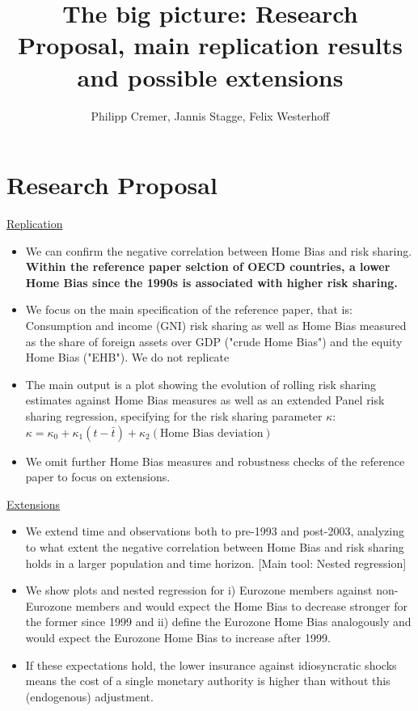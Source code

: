 \documentclass{article}
\title{The big picture: Research Proposal, main replication results and possible extensions}
\author{Philipp Cremer, Jannis Stagge, Felix Westerhoff}
\begin{document}
\maketitle

\section{Research Proposal}
\noindent \underline{Replication}
\begin{itemize}
    \item We can confirm the negative correlation between Home Bias and risk sharing. \textbf{Within the reference paper selction of OECD countries, a lower Home Bias since the 1990s is associated with higher risk sharing.}
    \item We focus on the main specification of the reference paper, that is: Consumption and income (GNI) risk sharing as well as Home Bias measured as the share of foreign assets over GDP ("crude Home Bias") and the equity Home Bias ("EHB"). We do not replicate
    \item The main output is a plot showing the evolution of rolling risk sharing estimates against Home Bias measures as well as an extended Panel risk sharing regression, specifying for the risk sharing parameter $\kappa$: $\kappa = \kappa_0 + \kappa_1 (t-\bar{t}) + \kappa_2 (\text{Home Bias deviation})$
    \item We omit further Home Bias measures and robustness checks of the reference paper to focus on extensions.
\end{itemize}

\noindent \underline{Extensions}
\begin{itemize}
    \item We extend time and observations both to pre-1993 and post-2003, analyzing to what extent the negative correlation between Home Bias and risk sharing holds in a larger population and time horizon. [Main tool: Nested regression]
    \item We show plots and nested regression for i) Eurozone members against non-Eurozone members and would expect the Home Bias to decrease stronger for the former since 1999 and ii) define the Eurozone Home Bias analogously and would expect the Eurozone Home Bias to increase after 1999.
    \item If these expectations hold, the lower insurance against idiosyncratic shocks means the cost of a single monetary authority is higher than without this (endogenous) adjustment.
\end{itemize}
\end{document}
